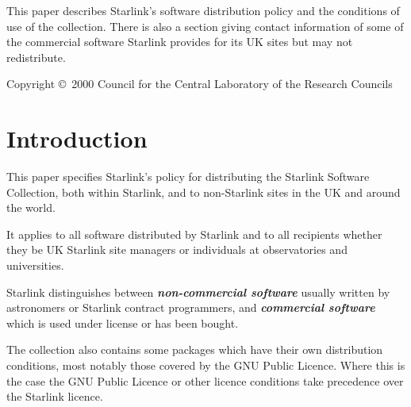 \documentclass[twoside,11pt]{article}
\newcommand{\stardocinitials}  {SGP}
\newcommand{\stardoccopyright} 
{Copyright \copyright\ 2000 Council for the Central Laboratory of the Research Councils}
\newcommand{\stardocnumber}    {21.10}
\newcommand{\stardocabstract}  {This paper describes Starlink's software 
distribution policy and the conditions of use of the collection.
There is also a section giving contact information of some of the 
commercial software Starlink provides for its UK sites but may not
redistribute.}
\newcommand{\stardocname}{\stardocinitials /\stardocnumber}
\newenvironment{latexonly}{}{}
\newcommand{\xlabel}[1]{}
\renewcommand{\_}{\texttt{\symbol{95}}}
\renewcommand{\thepage}{\roman{page}}
\begin{document}
\stardocabstract


  \newpage
  \begin{latexonly}
    \setlength{\parskip}{0mm}
    \tableofcontents
    \vspace*{\fill}
    \stardoccopyright
    \setlength{\parskip}{\medskipamount}
    \markboth{\stardocname}{\stardocname}
  \end{latexonly}
\cleardoublepage
\renewcommand{\thepage}{\arabic{page}}
\setcounter{page}{1}

\section{\xlabel{introduction}Introduction}
\label{introduction}

This paper specifies Starlink's policy for distributing the Starlink Software
Collection, both within Starlink, and to non-Starlink sites in the UK and 
around the world.

It applies to all software distributed by Starlink and to all recipients
whether they be UK Starlink site managers or individuals at observatories 
and universities.

Starlink distinguishes between \textbf{\textit{non-commercial
software}} usually written by astronomers or Starlink contract
programmers, and \textbf{\textit{commercial software}} which is used
under license or has been bought.  

The collection also contains some packages which have their own
distribution conditions, most notably those covered by the GNU Public
Licence.  Where this is the case the GNU Public Licence or other
licence conditions take precedence over the Starlink licence.
\end{document}
